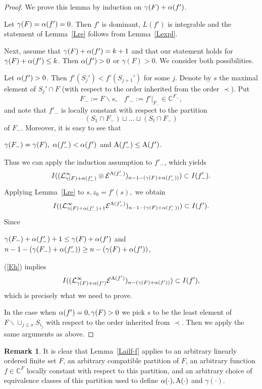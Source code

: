 \documentclass[10pt]{amsart}\oddsidemargin -1mm \evensidemargin -1mm \topmargin -15mm\headheight5mm \headsep 3.5mm \textheight 245mm\textwidth 170mm %
\theoremstyle{definition}\newtheorem{theorem}{Theorem}[section]\newtheorem{lemma}[theorem]{Lemma}\newtheorem{remark}[theorem]{Remark}\newtheorem{proposition}[theorem]{Proposition}\newtheorem{corollary}[theorem]{Corollary}\newtheorem{definition}[theorem]{Definition}\newtheorem{Ex}[theorem]{Example}
\begin{document}
\begin{proof} We prove this lemma by induction on $\gamma(F)+\operatorname{\alpha}(f')$.



Let $\gamma(F)=\operatorname{\alpha}(f')=0$. Then $f'$ is dominant, $L(f')$ is integrable and the statement of Lemma~\ref{Lre} follows from Lemma~\ref{Lexpl}.

Next, assume that $\gamma(F)+\operatorname{\alpha}(f')=k+1$ and that our statement holds for $\gamma(F)+\operatorname{\alpha}(f')\le k$. Then $\operatorname{\alpha}(f')>0$ or $\gamma(F)>0$. We consider both possibilities.

Let $\operatorname{\alpha}(f')>0$. Then $f'(S_j')<f'(S_{j+1}')$ for some $j$. Denote by $s$ the maximal element of $S_j'\cap F$ (with respect to the order inherited from the order $\prec$). Put $$F_-:=F\backslash s,\hspace{10pt}f'_-:=f'|_{F_-}\in\mathbb C^{F_-},$$and note that $f'_-$ is locally constant with respect to the partition $$(S_1\cap F_-)\sqcup...\sqcup(S_t\cap F_-)$$ of $F_-$. Moreover, it is easy to see that
\begin{center}$\gamma(F_-)=\gamma(F),~\operatorname{\alpha}(f'_-)<\operatorname{\alpha}(f')$ and $\operatorname{A}(f'_-)\le\operatorname{A}(f')$.\end{center} Thus we can apply the induction assumption to $f'_-$, which yields
$$I((\mathcal L_{\gamma(F)+\operatorname{\alpha}(f'_-)}^\infty\otimes\mathcal E^{\operatorname{A}(f'_-)})_{n-1-(\gamma(F)+\operatorname{\alpha}(f'_-))})\subset I(f'_-).$$
Applying Lemma~\ref{Lre} to $s, z_0=f'(s),$ we obtain
\begin{equation}I((\mathcal L_{\gamma(F)+\operatorname{\alpha}(f'_-)+1}^\infty\mathcal E^{\operatorname{A}(f'_-)})_{n-1-(\gamma(F)+\operatorname{\alpha}(f'_-))})\subset I(f').\label{Eh}\end{equation}
Since\begin{center}$\gamma(F_-)+\operatorname{\alpha}(f'_-)+1\le \gamma(F)+\operatorname{\alpha}(f')$ and $n-1-(\gamma(F_-)+\operatorname{\alpha}(f'_-))\ge n-(\gamma(F)+\operatorname{\alpha}(f'))$,\end{center}(\ref{Eh}) implies
$$I((\mathcal L_{\gamma(F)+\operatorname{\alpha}(f')}^\infty\mathcal E^{\operatorname{A}(f')})_{n-(\gamma(F)+\operatorname{\alpha}(f'))})\subset I(f'),$$
which is precisely what we need to prove.

In the case when $\operatorname{\alpha}(f')=0, \gamma(F)>0$ we pick $s$ to be the least element of $F\backslash\cup_{j\le x}S_{i_j}$ with respect to the order inherited from $\prec$. Then we apply the same arguments as above.
\end{proof}
\begin{remark}\label{R1} It is clear that Lemma~\ref{Lailf-f} applies to an arbitrary linearly ordered finite set $F$, an arbitrary compatible partition of $F$, an arbitrary function $f\in\mathbb C^F$ locally constant with respect to this partition, and an arbitrary choice of equivalence classes of this partition used to define $\operatorname{\alpha}(\cdot), \operatorname{A}(\cdot)$ and $\gamma(\cdot)$.\end{remark}
\end{document}

